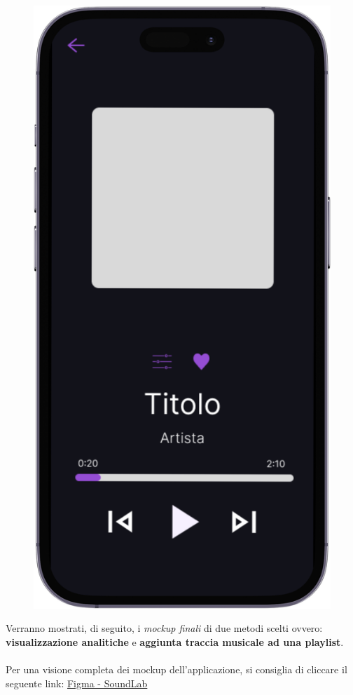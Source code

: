 \documentclass{article}
\begin{document}
\begin{figure}[htbp]
\begin{minipage}{0.18\textwidth}
					\includegraphics[width=\textwidth]{Immagini/foto7}
				\end{minipage}
			\end{figure}
			\newpage
		Verranno mostrati, di seguito, i\textit{ mockup finali} di due metodi scelti ovvero: \textbf{visualizzazione analitiche} e \textbf{aggiunta traccia musicale ad una playlist}.\\
		\\
		Per una visione completa dei mockup dell'applicazione, si consiglia di cliccare il seguente link: \href{https://www.figma.com/design/Ydobs9LpJIG0QtayPxFLHQ/SoundLab?node-id=0-1&t=WTyvVfdrgmC9HQYu-1}{Figma - SoundLab}
		\hspace{0.1\textwidth}
\end{document}
